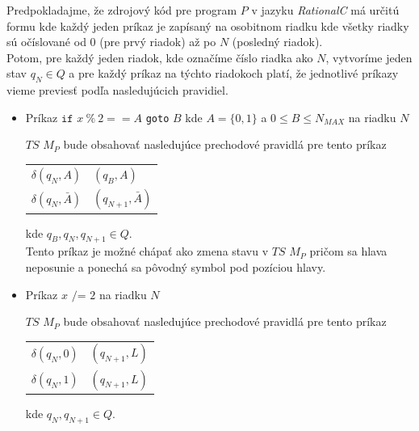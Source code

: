 \documentclass[11pt,a4paper]{article}
\begin{document}
Predpokladajme, že zdrojový kód pre program $P$ v jazyku \textit{RationalC} má určitú formu kde každý jeden príkaz je zapísaný na osobitnom riadku kde všetky riadky sú očíslované od $0$ (pre prvý riadok) až po $N$ (posledný riadok).\\

Potom, pre každý jeden riadok, kde označíme číslo riadka ako $N$, vytvoríme jeden stav $q_N \in Q$ a pre každý príkaz na týchto riadokoch platí, že jednotlivé príkazy vieme previesť podľa nasledujúcich pravidiel.

\newpage
\begin{itemize}
    \item Príkaz $\texttt{if } x \ \% \ 2 == A$ \texttt{goto} $B$ kde $A = \{0, 1\}$ a $0 \leq B \leq N_{MAX}$ na riadku $N$\\[-1.5em]
        \begin{flushright}
        \begin{minipage}{0.90\textwidth}
            $TS$ $M_P$ bude obsahovať nasledujúce prechodové pravidlá pre tento príkaz
            \begin{center}
            \begin{tabular}{r@{ $=$ }l}
                $\delta(q_{N}, A)$       & $(q_{B}, A)$\\
                $\delta(q_{N}, \bar{A})$ & $(q_{N+1}, \bar{A})$
            \end{tabular}
            \end{center}
            kde $q_{B}, q_{N}, q_{N+1} \in Q$.\\

            Tento príkaz je možné chápať ako zmena stavu v $TS$ $M_P$ pričom sa hlava neposunie a ponechá sa pôvodný symbol pod pozíciou hlavy.
        \end{minipage}
        \end{flushright}
    \item Príkaz $x \texttt{ /= } 2$ na riadku $N$\\[-1.5em]
        \begin{flushright}
        \begin{minipage}{0.90\textwidth}
            $TS$ $M_P$ bude obsahovať nasledujúce prechodové pravidlá pre tento príkaz
            \begin{center}
            \begin{tabular}{r@{ $=$ }l}
                $\delta(q_{N}, 0)$ & $(q_{N+1}, L)$\\
                $\delta(q_{N}, 1)$ & $(q_{N+1}, L)$
            \end{tabular}
            \end{center}
            kde $q_{N}, q_{N+1} \in Q$.\\


\end{minipage}
\end{flushright}
\end{itemize}
\end{document}

